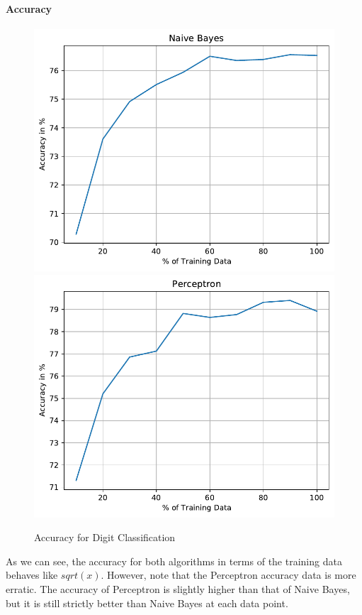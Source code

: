 \documentclass{article}
\begin{document}
  \paragraph{Accuracy}
  \begin{figure}[H]
  \includegraphics[width=0.45\linewidth]{figures/Naive Bayes_accuracy_DIGIT.pdf}\hfill
  \includegraphics[width=0.45\linewidth]{figures/Perceptron_accuracy_DIGIT.pdf}\hfill
  \caption{Accuracy for Digit Classification}
  \end{figure}
  As we can see, the accuracy for both algorithms in terms of the training data behaves like $sqrt(x)$.
  However, note that the Perceptron accuracy data is more erratic.
  The accuracy of Perceptron is slightly higher than that of Naive Bayes, but it is still strictly better than Naive Bayes at each data point.
\end{document}
